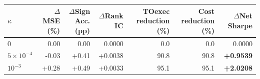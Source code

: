 \begin{tabular}{lrrrrrr}
\hline
$\kappa$ & $\Delta$MSE (\%) & $\Delta$Sign Acc. (pp) & $\Delta$Rank IC & TOexec reduction (\%) & Cost reduction (\%) & $\Delta$Net Sharpe \\
\hline
$0$ & 0.00 & 0.00 & 0.0000 & 0.0 & 0.0 & 0.0000 \\
$5\times10^{-4}$ & -0.03 & +0.41 & +0.0038 & 90.8 & 90.8 & \textbf{+0.9539} \\
$10^{-3}$ & +0.28 & +0.49 & +0.0033 & 95.1 & 95.1 & \textbf{+2.0208} \\
\hline
\end{tabular}
